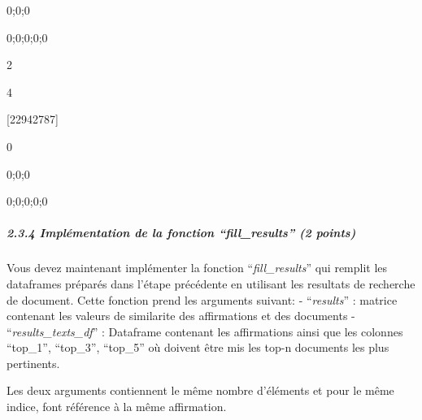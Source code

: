 \documentclass[11pt]{article}
\begin{document}
0;0;0

0;0;0;0;0

2

4

{[}22942787{]}

0

0;0;0

0;0;0;0;0

    \subparagraph{\texorpdfstring{2.3.4 Implémentation de la fonction
``\emph{fill\_results}'' (2
points)}{2.3.4 Implémentation de la fonction ``fill\_results'' (2 points)}}\label{impluxe9mentation-de-la-fonction-fill_results-2-points}

Vous devez maintenant implémenter la fonction ``\emph{fill\_results}''
qui remplit les dataframes préparés dans l'étape précédente en utilisant
les resultats de recherche de document. Cette fonction prend les
arguments suivant: - ``\emph{results}'' : matrice contenant les valeurs
de similarite des affirmations et des documents -
``\emph{results\_texts\_df}'' : Dataframe contenant les affirmations
ainsi que les colonnes ``top\_1'', ``top\_3'', ``top\_5'' où doivent
être mis les top-n documents les plus pertinents.

Les deux arguments contiennent le même nombre d'éléments et pour le même
indice, font référence à la même affirmation.
\end{document}
